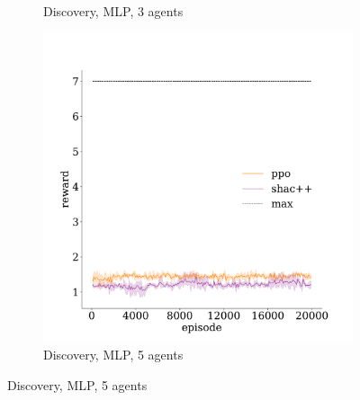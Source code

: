 \begin{figure}[t]
\begin{subfigure}[b]{0.32\textwidth}
        \caption{Discovery, MLP, 3 agents}
        \label{apx:fig:discovery-mlp-3}
    \end{subfigure}
    \begin{subfigure}[b]{0.32\textwidth}
        \includegraphics[width=\textwidth]{figs/discovery-5-mlp.pdf}
        \caption{Discovery, MLP, 5 agents}
        \label{apx:fig:discovery-mlp-5}
    \end{subfigure}


\end{figure}
